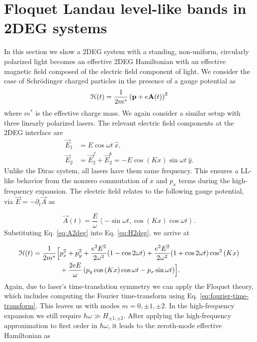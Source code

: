 \section{Floquet Landau level-like bands in 2DEG systems}
In this section we show a 2DEG system with a standing, non-uniform, circularly polarized light becomes an effective 2DEG Hamiltonian with an effective magnetic field composed of the electric field component of light.
We consider the case of Schr\"{o}dinger charged particles in the presence of a gauge potential as
\begin{equation}\label{eq:H2deg}
  \mathcal{H}(t) = \dfrac{1}{2m^*} \left( \mathbf{p} + e \mathbf{A}(t)\right)^2
\end{equation}
where $m^*$ is the effective charge mass.
We again consider a similar setup with three linearly polarized lasers.
The relevant electric field components at the 2DEG interface are
\begin{align} \label{eq:E2field}
  \vec{E}_{1} &= E \cos{\omega t}\ \hat{x}, \nonumber \\
  \vec{E}_{2} &= \vec{E}_2^f + \vec{E}_2^b = -E\cos{(K x)} \sin{\omega t}\ \hat{y}.
\end{align}%
Unlike the Dirac system, all lasers have them same frequency.
This ensures a LL-like behavior from the nonzero commutation of $x$ and $p_x$ terms during the high-frequency expansion.
The electric field relates to the following gauge potential, via $\vec{E} = -\partial_t \vec{A}$ as

\begin{equation}\label{eq:A2deg}
  \vec{A}(t)= \dfrac{E}{\omega} \left\langle -\sin \omega t, \cos{(Kx)} \cos{\omega t} \right\rangle.
\end{equation}%
Substituting Eq. \eqref{eq:A2deg} into Eq. \eqref{eq:H2deg}, we arrive at

\begin{align}\label{eq:H2time}
  \mathcal{H}(t) = \dfrac{1}{2m^*} \Bigl[ &p_x^2 + p_y^2 + \dfrac{e^2 E^2}{2\omega^2}(1-\cos{2\omega t}) + \dfrac{e^2 E^2}{2\omega^2}(1+\cos{2\omega t}) \cos^2{(Kx)} \nonumber \\
  &+\dfrac{2eE}{\omega} \left(p_y \cos{(Kx)}\cos{\omega t} -  p_x \sin{\omega t}\right) \Bigr].
\end{align}
Again, due to laser's time-translation symmetry we can apply the Floquet theory, which includes computing the Fourier time-transform using Eq. \eqref{eq:fourier-time-transform}.
This leaves us with modes $m=0,\pm1,\pm2$.
In the high-frequency expansion we still require $\hbar \omega \gg H_{\pm1,\pm2}$.
After applying the high-frequency approximation to first order in $\hbar \omega$, it leads to the zeroth-mode effective Hamiltonian as

